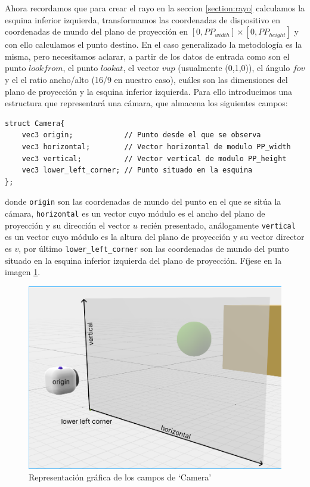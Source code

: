 Ahora recordamos que para crear el rayo en la seccion \ref{section:rayo} calculamos la esquina inferior izquierda, transformamos las coordenadas de dispositivo en coordenadas de mundo del plano de proyección en $[0,PP_{width}]\times[0,PP_{height}]$ y con ello calculamos el punto destino. En el caso generalizado la metodología es la misma, pero necesitamos aclarar, a partir de los datos de entrada como son el punto $lookfrom$, el punto $lookat$, el vector $vup$ (usualmente (0,1,0)), el ángulo $fov$ y el el ratio ancho/alto (16/9 en nuestro caso), cuáles son las dimensiones del plano de proyección y la esquina inferior izquierda. Para ello introducimos una estructura que representará una cámara, que almacena los siguientes campos:

\begin{lstlisting}
struct Camera{
    vec3 origin;            // Punto desde el que se observa
    vec3 horizontal;        // Vector horizontal de modulo PP_width
    vec3 vertical;          // Vector vertical de modulo PP_height
    vec3 lower_left_corner; // Punto situado en la esquina
};
\end{lstlisting}
donde \verb|origin| son las coordenadas de mundo del punto en el que se sitúa la cámara, \verb|horizontal| es un vector cuyo módulo es el ancho del plano de proyección y su dirección el vector $u$ recién presentado, análogamente \verb|vertical| es un vector cuyo módulo es la altura del plano de proyección y su vector director es $v$, por último \verb|lower_left_corner| son las coordenadas de mundo del punto situado en la esquina inferior izquierda del plano de proyección. Fíjese en la imagen \ref{fig:camera-fields}.

\begin{figure} [ht]
    \centering
    \includegraphics[scale = 0.3]{img/C7/camera-fields.png}
    \caption{Representación gráfica de los campos de `Camera'}
    \label{fig:camera-fields}
\end{figure}


